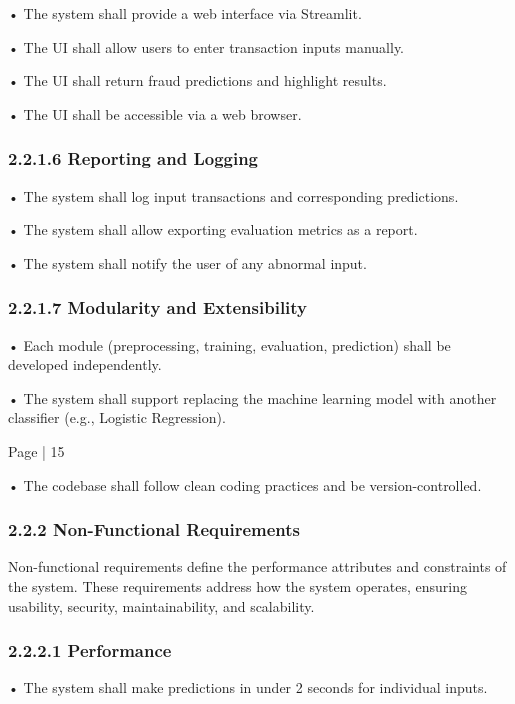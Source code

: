 \documentclass[11pt,a4paper]{article}
\begin{document}
• 
The system shall provide a web interface via Streamlit. 

• 
The UI shall allow users to enter transaction inputs manually. 

• 
The UI shall return fraud predictions and highlight results. 

• 
The UI shall be accessible via a web browser. 

\subsubsection*{2.2.1.6 Reporting and Logging }

• 
The system shall log input transactions and corresponding predictions. 

• 
The system shall allow exporting evaluation metrics as a report. 

• 
The system shall notify the user of any abnormal input. 

\subsubsection*{2.2.1.7 Modularity and Extensibility }

• 
Each module (preprocessing, training, evaluation, prediction) shall be developed independently. 

• 
The system shall support replacing the machine learning model with another classifier (e.g., Logistic 
Regression). 

Page | 15  

\newpage

• 
The codebase shall follow clean coding practices and be version-controlled. 

\subsubsection*{2.2.2 Non-Functional Requirements }

Non-functional requirements define the performance attributes and constraints of the system. These 
requirements address how the system operates, ensuring usability, security, maintainability, and scalability. 

\subsubsection*{2.2.2.1 Performance }

• 
The system shall make predictions in under 2 seconds for individual inputs. 
\end{document}
